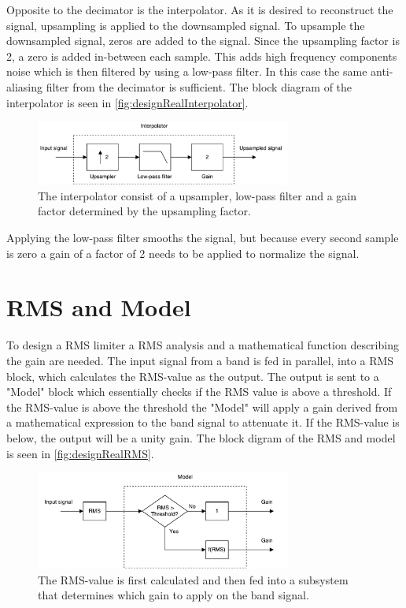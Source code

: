 Opposite to the decimator is the interpolator. As it is desired to reconstruct the signal, upsampling is applied to the downsampled signal. To upsample the downsampled signal, zeros are added to the signal. Since the upsampling factor is 2, a zero is added in-between each sample. This adds high frequency components noise which is then filtered by using a low-pass filter. In this case the same anti-aliasing filter from the decimator is sufficient. The block diagram of the interpolator is seen in \autoref{fig:designRealInterpolator}.

\begin{figure}[H]
\centering
\includegraphics[width=0.75\textwidth]{figures/designRealInterpolator.pdf}
\caption{The interpolator consist of a upsampler, low-pass filter and a gain factor determined by the upsampling factor.}
\label{fig:designRealInterpolator}
\end{figure}

Applying the low-pass filter smooths the signal, but because every second sample is zero a gain of a factor of 2 needs to be applied to normalize the signal.


\section{RMS and Model}

To design a RMS limiter a RMS analysis and a mathematical function describing the gain are needed. The input signal from a band is fed in parallel, into a RMS block, which calculates the RMS-value as the output. The output is sent to a "Model" block which essentially checks if the RMS value is above a threshold. If the RMS-value is above the threshold the "Model" will apply a gain derived from a mathematical expression to the band signal to attenuate it. If the RMS-value is below, the output will be a unity gain. The block digram of the RMS and model is seen in \autoref{fig:designRealRMS}.

\begin{figure}[H]
\centering
\includegraphics[width=0.75\textwidth]{figures/designRealRMS.pdf}
\caption{The RMS-value is first calculated and then fed into a subsystem that determines which gain to apply on the band signal.}
\label{fig:designRealRMS}
\end{figure}

